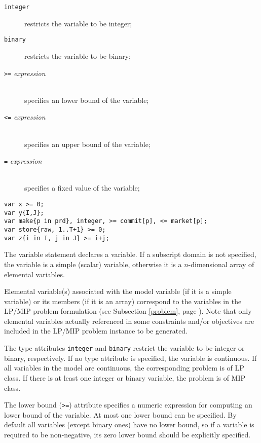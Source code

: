 \documentclass[10pt]{article}
\begin{document}
\begin{description}
\item[{\tt integer}\hspace*{18.5pt}] restricts the variable to be
integer;
\item[{\tt binary}\hspace*{24pt}] restricts the variable to be binary;
\item[{\tt>=} {\it expression}]\hspace*{0pt}\\
specifies an lower bound of the variable;
\item[{\tt<=} {\it expression}]\hspace*{0pt}\\
specifies an upper bound of the variable;
\item[{\tt=} {\it expression}]\hspace*{0pt}\\
specifies a fixed value of the variable;
\end{description}


\begin{verbatim}
var x >= 0;
var y{I,J};
var make{p in prd}, integer, >= commit[p], <= market[p];
var store{raw, 1..T+1} >= 0;
var z{i in I, j in J} >= i+j;
\end{verbatim}

The variable statement declares a variable. If a subscript domain is
not specified, the variable is a simple (scalar) variable, otherwise it
is a $n$-dimensional array of elemental variables.

Elemental variable(s) associated with the model variable (if it is a
simple variable) or its members (if it is an array) correspond to the
variables in the LP/MIP problem formulation (see Subsection
\ref{problem}, page \pageref{problem}). Note that only elemental
variables actually referenced in some constraints and/or objectives are
included in the LP/MIP problem instance to be generated.

The type attributes {\tt integer} and {\tt binary} restrict the
variable to be integer or binary, respectively. If no type attribute is
specified, the variable is continuous. If all variables in the model
are continuous, the corresponding problem is of LP class. If there is
at least one integer or binary variable, the problem is of MIP class.

The lower bound ({\tt>=}) attribute specifies a numeric expression for
computing an lower bound of the variable. At most one lower bound can
be specified. By default all variables (except binary ones) have no
lower bound, so if a variable is required to be non-negative, its zero
lower bound should be explicitly specified.
\end{document}

